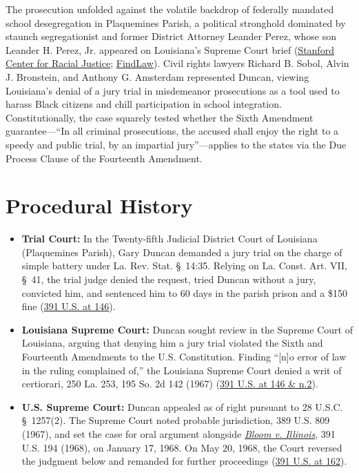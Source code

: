 \documentclass[12pt]{article}
\begin{document}
The prosecution unfolded against the volatile backdrop of federally mandated school desegregation in Plaquemines Parish, a political stronghold dominated by staunch segregationist and former District Attorney Leander Perez, whose son Leander H. Perez, Jr. appeared on Louisiana's Supreme Court brief (\href{https://law.stanford.edu/2022/10/12/the-civil-rights-significance-of-duncan-v-louisiana-and-the-right-to-a-jury-trial/}{Stanford Center for Racial Justice}; \href{https://caselaw.findlaw.com/court/us-supreme-court/391/145.html}{FindLaw}). Civil rights lawyers Richard B. Sobol, Alvin J. Bronstein, and Anthony G. Amsterdam represented Duncan, viewing Louisiana's denial of a jury trial in misdemeanor prosecutions as a tool used to harass Black citizens and chill participation in school integration. Constitutionally, the case squarely tested whether the Sixth Amendment guarantee---``In all criminal prosecutions, the accused shall enjoy the right to a speedy and public trial, by an impartial jury''---applies to the states via the Due Process Clause of the Fourteenth Amendment.

\section{Procedural History}

\begin{itemize}
  \item \textbf{Trial Court:} In the Twenty-fifth Judicial District Court of Louisiana (Plaquemines Parish), Gary Duncan demanded a jury trial on the charge of simple battery under La. Rev. Stat. \S~14:35. Relying on La. Const. Art. VII, \S~41, the trial judge denied the request, tried Duncan without a jury, convicted him, and sentenced him to 60 days in the parish prison and a \$150 fine (\href{https://caselaw.findlaw.com/court/us-supreme-court/391/145.html}{391 U.S. at 146}).
  \item \textbf{Louisiana Supreme Court:} Duncan sought review in the Supreme Court of Louisiana, arguing that denying him a jury trial violated the Sixth and Fourteenth Amendments to the U.S. Constitution. Finding ``[n]o error of law in the ruling complained of,'' the Louisiana Supreme Court denied a writ of certiorari, 250 La. 253, 195 So. 2d 142 (1967) (\href{https://supreme.justia.com/cases/federal/us/391/145/}{391 U.S. at 146 \& n.2}).
  \item \textbf{U.S. Supreme Court:} Duncan appealed as of right pursuant to 28 U.S.C. \S~1257(2). The Supreme Court noted probable jurisdiction, 389 U.S. 809 (1967), and set the case for oral argument alongside \href{https://supreme.justia.com/cases/federal/us/391/194/}{\textit{Bloom v. Illinois}}, 391 U.S. 194 (1968), on January 17, 1968. On May 20, 1968, the Court reversed the judgment below and remanded for further proceedings (\href{https://www.courtlistener.com/opinion/107685/duncan-v-louisiana/}{391 U.S. at 162}).
\end{itemize}
\end{document}
